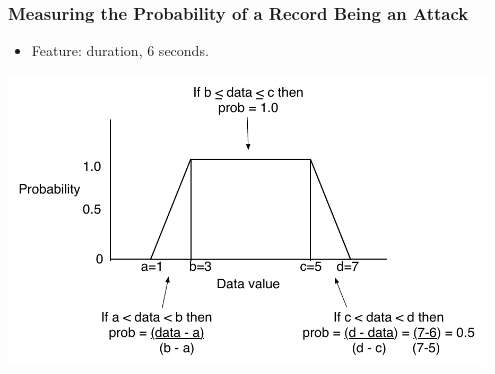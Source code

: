 \documentclass{beamer}
\newcommand{\linespace}{\vskip 0.25cm}
\begin{document}
\begin{frame}
  \frametitle{Measuring the Probability of a Record Being an Attack}
	\begin{itemize}	
	\item Feature: duration, 6 seconds.
	\end{itemize}
  \includegraphics[width=0.95\textwidth]{../trapFigExample.pdf}


\end{frame}
\end{document}
